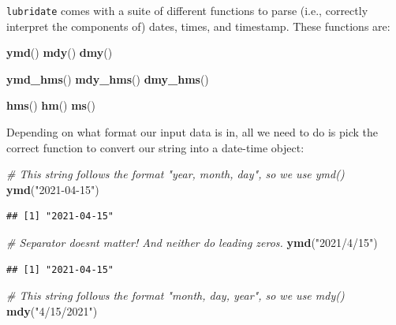 \documentclass[
]{book}
\newenvironment{Shaded}{\begin{snugshade}}{\end{snugshade}}
\newcommand{\CommentTok}[1]{\textcolor[rgb]{0.56,0.35,0.01}{\textit{#1}}}
\newcommand{\FunctionTok}[1]{\textcolor[rgb]{0.13,0.29,0.53}{\textbf{#1}}}
\newcommand{\NormalTok}[1]{#1}
\newcommand{\StringTok}[1]{\textcolor[rgb]{0.31,0.60,0.02}{#1}}
\begin{document}
\texttt{lubridate} comes with a suite of different functions to parse (i.e., correctly interpret the components of) dates, times, and timestamp. These functions are:

\begin{Shaded}
\begin{Highlighting}[]
\FunctionTok{ymd}\NormalTok{()}
\FunctionTok{mdy}\NormalTok{()}
\FunctionTok{dmy}\NormalTok{()}

\FunctionTok{ymd\_hms}\NormalTok{()}
\FunctionTok{mdy\_hms}\NormalTok{()}
\FunctionTok{dmy\_hms}\NormalTok{()}

\FunctionTok{hms}\NormalTok{()}
\FunctionTok{hm}\NormalTok{()}
\FunctionTok{ms}\NormalTok{()}
\end{Highlighting}
\end{Shaded}

Depending on what format our input data is in, all we need to do is pick the correct function to convert our string into a date-time object:

\begin{Shaded}
\begin{Highlighting}[]
\CommentTok{\# This string follows the format "year, month, day", so we use ymd()}
\FunctionTok{ymd}\NormalTok{(}\StringTok{"2021{-}04{-}15"}\NormalTok{)}
\end{Highlighting}
\end{Shaded}

\begin{verbatim}
## [1] "2021-04-15"
\end{verbatim}

\begin{Shaded}
\begin{Highlighting}[]
\CommentTok{\# Separator doesn\textquotesingle{}t matter! And neither do leading zeros.}
\FunctionTok{ymd}\NormalTok{(}\StringTok{"2021/4/15"}\NormalTok{)}
\end{Highlighting}
\end{Shaded}

\begin{verbatim}
## [1] "2021-04-15"
\end{verbatim}

\begin{Shaded}
\begin{Highlighting}[]
\CommentTok{\# This string follows the format "month, day, year", so we use mdy()}
\FunctionTok{mdy}\NormalTok{(}\StringTok{"4/15/2021"}\NormalTok{)}
\end{Highlighting}
\end{Shaded}
\end{document}
